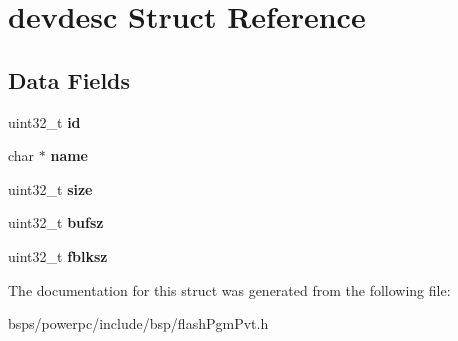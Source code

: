 \hypertarget{structdevdesc}{}\section{devdesc Struct Reference}
\label{structdevdesc}
\subsection*{Data Fields}
\begin{DoxyCompactItemize}
\item 
\mbox{\label{structdevdesc_a7b7c5600e1e8159cbe2c7041ba6ee2f7}} 
uint32\+\_\+t {\bfseries id}
\item 
\mbox{\label{structdevdesc_a78a30524f44956b5dcd1677f349008f1}} 
char $\ast$ {\bfseries name}
\item 
\mbox{\label{structdevdesc_a3e0947d8375a712e279ab687e88d6594}} 
uint32\+\_\+t {\bfseries size}
\item 
\mbox{\label{structdevdesc_a96f04036af00d14926dee105fd64d951}} 
uint32\+\_\+t {\bfseries bufsz}
\item 
\mbox{\label{structdevdesc_ac2974d3bead15a0aa806af0dd009835d}} 
uint32\+\_\+t {\bfseries fblksz}
\end{DoxyCompactItemize}


The documentation for this struct was generated from the following file\+:\begin{DoxyCompactItemize}
\item 
bsps/powerpc/include/bsp/flash\+Pgm\+Pvt.\+h\end{DoxyCompactItemize}
